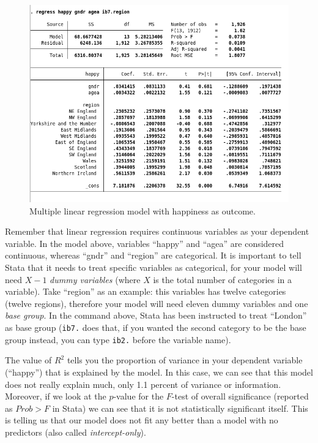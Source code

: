 \begin{figure}[H]
	\includegraphics[width=\linewidth]{./img/mult_reg1.png}
	\caption{Multiple linear regression model with happiness as outcome.}
\end{figure}

Remember that linear regression requires continuous variables as your dependent variable. In the model above, variables ``happy'' and ``agea'' are considered continuous, whereas ``gndr'' and ``region'' are categorical. It is important to tell Stata that it needs to treat specific variables as categorical, for your model will need $X-1$ \textit{dummy variables} (where $X$ is the total number of categories in a variable). Take ``region'' as an example: this variables has twelve categories (twelve regions), therefore your model will need eleven dummy variables and one \textit{base group}. In the command above, Stata has been instructed to treat ``London'' as base group (\texttt{ib7.} does that, if you wanted the second category to be the base group instead, you can type \texttt{ib2.} before the variable name).

The value of $R^2$ tells you the proportion of variance in your dependent variable (``happy'') that is explained by the model. In this case, we can see that this model does not really explain much, only 1.1 percent of variance or information. Moreover, if we look at the $p$-value for the $F$-test of overall significance (reported as $Prob > F$ in Stata) we can see that it is not statistically significant itself. This is telling us that our model does not fit any better than a model with no predictors (also called \textit{intercept-only}). 

